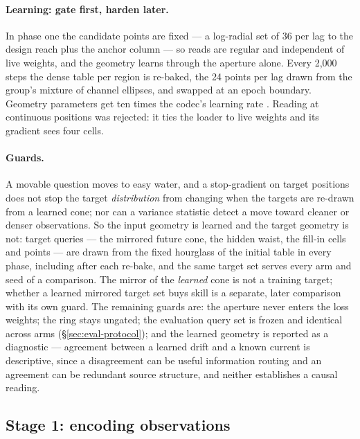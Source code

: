 \documentclass[10pt]{article}
\begin{document}
\paragraph{Learning: gate first, harden later.} In phase one the candidate
points are fixed --- a log-radial set of 36 per lag to the design reach plus
the anchor column --- so reads are regular and independent of live weights,
and the geometry learns through the aperture alone. Every 2{,}000 steps the
dense table per region is re-baked, the 24 points per lag drawn from the
group's mixture of channel ellipses, and swapped at an epoch boundary.
Geometry parameters get ten times the codec's learning rate
\cite{deformable}. Reading at continuous positions was rejected: it ties the
loader to live weights and its gradient sees four cells.

\paragraph{Guards.} A movable question moves to easy water, and a
stop-gradient on target positions does not stop the target
\emph{distribution} from changing when the targets are re-drawn from a
learned cone; nor can a variance statistic detect a move toward cleaner or
denser observations. So the input geometry is learned and the target
geometry is not: target queries --- the mirrored future cone, the hidden
waist, the fill-in cells and points --- are drawn from the fixed hourglass of
the initial table in every phase, including after each re-bake, and the
same target set serves every arm and seed of a comparison. The mirror of the
\emph{learned} cone is not a training target; whether a learned mirrored
target set buys skill is a separate, later comparison with its own guard.
The remaining guards are: the aperture never enters the loss weights; the
ring stays ungated; the evaluation query set is frozen and identical across
arms (\S\ref{sec:eval-protocol}); and the learned geometry is reported as a
diagnostic --- agreement between a learned drift and a known current is
descriptive, since a disagreement can be useful information routing and an
agreement can be redundant source structure, and neither establishes a
causal reading.

\subsection{Stage 1: encoding observations}\label{sec:stage1}
\end{document}
